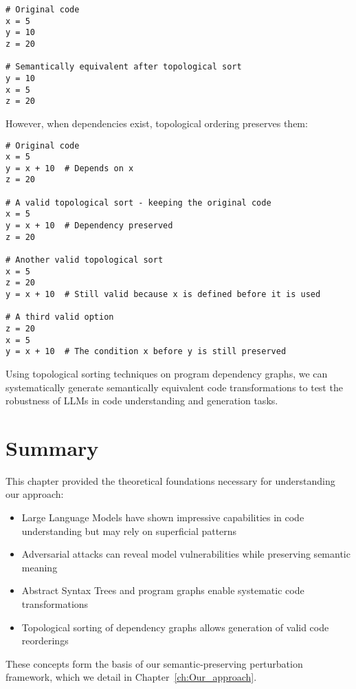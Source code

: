 \documentclass[%
thesis=student,%
coverpage=false,%
titlepage=false,%
headmarks=true, %
english,%
font=libertine, %
math=newpxtx, %
BCOR=5mm,%
coverBCOR=11mm%
]{tum-templates/book/tumbook}
\begin{document}
\begin{lstlisting}[style=pythonstyle, caption={Two examples of semantic-preserving reorderings without any dependencies to consider}]
# Original code
x = 5
y = 10
z = 20

# Semantically equivalent after topological sort
y = 10
x = 5
z = 20
\end{lstlisting}

However, when dependencies exist, topological ordering preserves them:

\begin{lstlisting}[style=pythonstyle, caption={Different valid reorderings, preserving and existing dependency between x and y}]
# Original code
x = 5
y = x + 10  # Depends on x
z = 20

# A valid topological sort - keeping the original code
x = 5
y = x + 10  # Dependency preserved
z = 20

# Another valid topological sort
x = 5
z = 20
y = x + 10  # Still valid because x is defined before it is used

# A third valid option
z = 20
x = 5
y = x + 10  # The condition x before y is still preserved
\end{lstlisting}


Using topological sorting techniques on program dependency graphs, we can systematically generate semantically equivalent code transformations to test the robustness of LLMs in code understanding and generation tasks.


\section{Summary}

This chapter provided the theoretical foundations necessary for understanding our approach:
\begin{itemize}
    \item Large Language Models have shown impressive capabilities in code understanding but may rely on superficial patterns
    \item Adversarial attacks can reveal model vulnerabilities while preserving semantic meaning
    \item Abstract Syntax Trees and program graphs enable systematic code transformations
    \item Topological sorting of dependency graphs allows generation of valid code reorderings
\end{itemize}

These concepts form the basis of our semantic-preserving perturbation framework, which we detail in Chapter~\ref{ch:Our_approach}.
\end{document}

